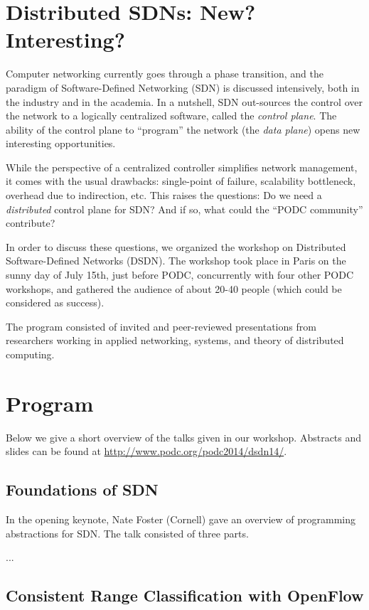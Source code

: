 \documentclass[11pt,pdftex,letter]{article}
\begin{document}
\section{Distributed SDNs: New? Interesting?}

Computer networking currently goes through a phase transition, and the paradigm of Software-Defined Networking (SDN)
is discussed intensively, both in the industry and in the academia. In
a nutshell, SDN out-sources the control over the network 
to a logically centralized software, called the \emph{control plane}. 
The ability of the control plane to ``program'' the network (the
\emph{data plane}) opens new interesting opportunities.

 While the perspective of a centralized controller simplifies network management,
it comes with the usual drawbacks: single-point of failure,
scalability bottleneck, overhead due to indirection, etc. 
This raises the questions: Do we need a \emph{distributed} control plane for SDN? And if so,
what could the ``PODC community'' contribute?

In order to discuss these questions, we organized the workshop on Distributed
Software-Defined Networks (DSDN). The workshop took
place in Paris on the sunny day of July 15th, just before
PODC, concurrently with four other PODC workshops, and gathered the
audience of about 20-40 people (which could be considered as success). 

The program consisted of invited and peer-reviewed presentations from researchers working in applied networking,
systems, and theory of distributed computing.


\section{Program}

Below we give a short overview of the talks given in our
workshop. Abstracts and slides can be found at \url{http://www.podc.org/podc2014/dsdn14/}. 

\subsection{Foundations of SDN}

In the opening keynote, Nate Foster (Cornell) gave an overview of
programming abstractions for SDN. The talk consisted of three parts. 

... 


\subsection{Consistent Range Classification with OpenFlow} 
\end{document}
